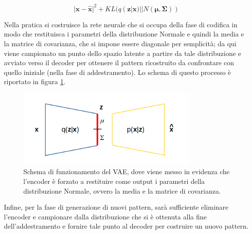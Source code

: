 \begin{equation}
	{\lvert \textbf{x}-\hat{\textbf{x}} \rvert}^2 + KL (q(\textbf{z}|\textbf{x})||N(\bm{\mu},\bm{\Sigma}))
\end{equation}

Nella pratica si costruisce la rete neurale che si occupa della fase di codifica in modo che restituisca i parametri della distribuzione Normale e quindi la media e la matrice di covarianza, che si impone essere diagonale per semplicità; da qui viene campionato un punto dello spazio latente a partire da tale distribuzione e avviato verso il decoder per ottenere il pattern ricostruito da confrontare con quello iniziale (nella fase di addestramento). Lo schema di questo processo è riportato in figura \ref{schemaVAEs}.
\newpage

\begin{figure}[h!]
	\centering		\includegraphics[width=0.80\textwidth]{figs/VAEgauss.png}
	\caption{Schema di funzionamento del VAE, dove viene messo in evidenza che l'encoder è forzato a restituire come output i parametri della distribuzione Normale, ovvero la media e la matrice di covarianza.}
	\label{schemaVAEs}
\end{figure}


Infine, per la fase di generazione di nuovi pattern, sarà sufficiente eliminare l'encoder e campionare dalla distribuzione che si è ottenuta alla fine dell'addestramento e fornire tale punto al decoder per costruire un nuovo pattern.



\newpage